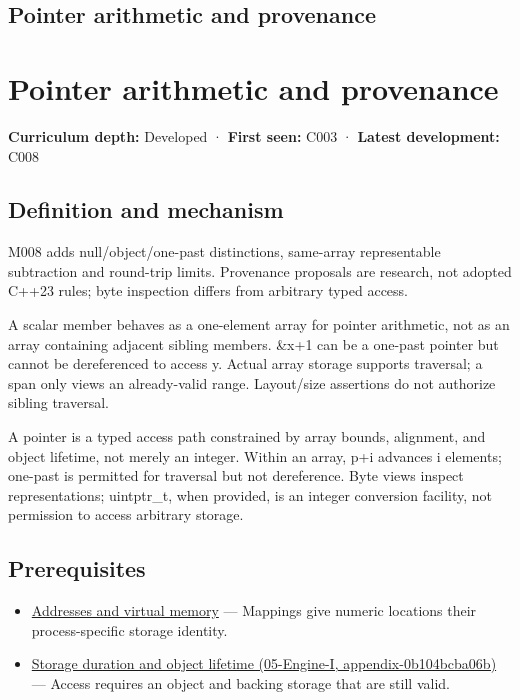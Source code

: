 \hypertarget{appendix-6af5921bc853}{}
\section*{Pointer arithmetic and provenance}
\chapter{Pointer arithmetic and provenance}\label{appendix-6af5921bc853-pointer-arithmetic-and-provenance}

\textbf{Curriculum depth:} Developed · \textbf{First seen:} C003 · \textbf{Latest development:} C008

\section{Definition and mechanism}\label{appendix-6af5921bc853-definition-and-mechanism}

M008 adds null/object/one-past distinctions, same-array representable subtraction and round-trip limits. Provenance proposals are research, not adopted C++23 rules; byte inspection differs from arbitrary typed access.

A scalar member behaves as a one-element array for pointer arithmetic, not as an array containing adjacent sibling members. \&x+1 can be a one-past pointer but cannot be dereferenced to access y. Actual array storage supports traversal; a span only views an already-valid range. Layout/size assertions do not authorize sibling traversal.

A pointer is a typed access path constrained by array bounds, alignment, and object lifetime, not merely an integer. Within an array, p+i advances i elements; one-past is permitted for traversal but not dereference. Byte views inspect representations; uintptr\_t, when provided, is an integer conversion facility, not permission to access arbitrary storage.

\section{Prerequisites}\label{appendix-6af5921bc853-prerequisites}

\begin{itemize}
\tightlist
\item
  \hyperref[appendix-18ee4f913c3c]{Addresses and virtual memory} --- Mappings give numeric locations their process-specific storage identity.
\item
  \href{../05-Engine-I/main.pdf\#nameddest=appendix-0b104bcba06b}{Storage duration and object lifetime (05-Engine-I, appendix-0b104bcba06b)} --- Access requires an object and backing storage that are still valid.
\end{itemize}

